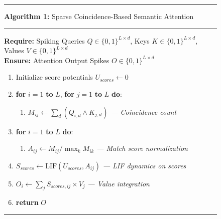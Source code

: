 \documentclass{article} %
\begin{document}
\begin{figure}[h]
\hrule
\vspace{2mm}
\textbf{Algorithm 1:} Sparse Coincidence-Based Semantic Attention
\vspace{1mm}
\hrule
\vspace{2mm}
\textbf{Require:} Spiking Queries $Q \in \{0,1\}^{L \times d}$, Keys $K \in \{0,1\}^{L \times d}$, Values $V \in \{0,1\}^{L \times d}$ \\
\textbf{Ensure:} Attention Output Spikes $O \in \{0,1\}^{L \times d}$
\begin{enumerate}
    \item Initialize score potentials $U_{scores} \leftarrow 0$
    \item \textbf{for} $i = 1$ \textbf{to} $L$, \textbf{for} $j = 1$ \textbf{to} $L$ \textbf{do}:
    \begin{enumerate}
        \item $M_{ij} \leftarrow \sum_d (Q_{i,d} \wedge K_{j,d})$ \hfill \textit{--- Coincidence count}
    \end{enumerate}
    \item \textbf{for} $i = 1$ \textbf{to} $L$ \textbf{do}:
    \begin{enumerate}
        \item $A_{ij} \leftarrow M_{ij} / \max_k M_{ik}$ \hfill \textit{--- Match score normalization}
    \end{enumerate}
    \item $S_{scores} \leftarrow \text{LIF}(U_{scores}, A_{ij})$ \hfill \textit{--- LIF dynamics on scores}
    \item $O_i \leftarrow \sum_j S_{scores,ij} \times V_j$ \hfill \textit{--- Value integration}
    \item \textbf{return} $O$
\end{enumerate}
\vspace{1mm}
\hrule
\label{alg:coincidence}
\end{figure}
\end{document}

